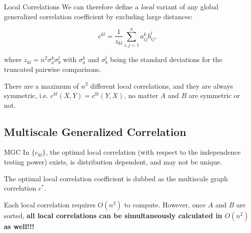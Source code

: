 \documentclass{beamer}
\newcommand{\G}{c}
\begin{document}
\begin{frame}{Local Correlations}
We can therefore define a \emph{local} variant of any global generalized correlation coefficient by  excluding large distances: 

\pause
\medskip
\begin{equation}
\label{localCoef}
\G^{kl}=\dfrac{1}{z_{kl}} {\textstyle \sum_{i,j=1}^n a_{ij}^k b_{ij}^l},
\end{equation}

\pause
\medskip
where $z_{kl}=n^2 \sigma_a^k \sigma_b^l$ with $\sigma_a^k$ and $\sigma_b^{l}$ being the standard deviations for the truncated pairwise comparisons. 

\pause
\medskip
There are a maximum of $n^2$ different local correlations, and they are always symmetric, i.e. $\G^{kl}(X,Y)=\G^{lk}(Y,X)$, no matter $A$ and $B$ are symmetric or not.
\end{frame}

\subsection{Multiscale Generalized Correlation}
\begin{frame}{MGC}
In $\{\G_{kl}\}$, the optimal local correlation (with respect to the independence testing power) exists, is distribution dependent, and may not be unique.

\pause
\medskip
The optimal local correlation coefficient is dubbed as the multiscale graph correlation $\G^{*}$.

\pause
\medskip
Each local correlation requires $O(n^2)$ to compute. However, once $A$ and $B$ are sorted, \textbf{all local correlations can be simultaneously calculated in $O(n^2)$ as well!!!}
\end{frame}
\end{document}

